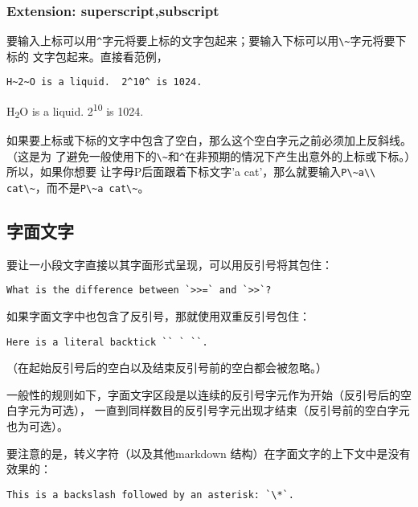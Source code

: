 \documentclass[cn]{elegantbook}
\newcommand{\passthrough}[1]{#1}
\begin{document}
\hypertarget{extension-superscriptsubscript}{%
\subsubsection{Extension:
superscript,subscript}\label{extension-superscriptsubscript}}

要输入上标可以用\passthrough{\lstinline!^!}字元将要上标的文字包起来；要输入下标可以用\passthrough{\lstinline!\~!}字元将要下标的
文字包起来。直接看范例，

\begin{lstlisting}
H~2~O is a liquid.  2^10^ is 1024.
\end{lstlisting}

H\textsubscript{2}O is a liquid. 2\textsuperscript{10} is 1024.

如果要上标或下标的文字中包含了空白，那么这个空白字元之前必须加上反斜线。（这是为
了避免一般使用下的\passthrough{\lstinline!\~!}和\passthrough{\lstinline!^!}在非预期的情况下产生出意外的上标或下标。）所以，如果你想要
让字母P后面跟着下标文字'a
cat'，那么就要输入\passthrough{\lstinline!P\~a\\ cat\~!}，而不是\passthrough{\lstinline!P\~a cat\~!}。

\hypertarget{ux5b57ux9762ux6587ux5b57}{%
\subsection{字面文字}\label{ux5b57ux9762ux6587ux5b57}}

要让一小段文字直接以其字面形式呈现，可以用反引号将其包住：

\begin{lstlisting}
What is the difference between `>>=` and `>>`?
\end{lstlisting}

如果字面文字中也包含了反引号，那就使用双重反引号包住：

\begin{lstlisting}
Here is a literal backtick `` ` ``.
\end{lstlisting}

（在起始反引号后的空白以及结束反引号前的空白都会被忽略。）

一般性的规则如下，字面文字区段是以连续的反引号字元作为开始（反引号后的空白字元为可选），
一直到同样数目的反引号字元出现才结束（反引号前的空白字元也为可选）。

要注意的是，转义字符（以及其他markdown
结构）在字面文字的上下文中是没有效果的：

\begin{lstlisting}
This is a backslash followed by an asterisk: `\*`.
\end{lstlisting}
\end{document}
